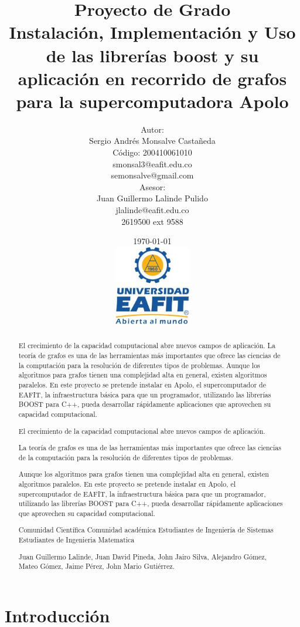 \documentclass[twoside,letterpaper,12pt]{report}
\title{
Proyecto de Grado\\[0.5cm]
Instalación, Implementación y Uso de las librerías boost y su aplicación en recorrido de grafos para la supercomputadora Apolo}
\author{
	Autor:\\[0.3cm]
	Sergio Andrés Monsalve Castañeda\\
	Código: 200410061010\\
	smonsal3@eafit.edu.co\\
	semonsalve@gmail.com\\[0.7cm]
	Asesor: \\[0.3cm]
	Juan Guillermo Lalinde Pulido\\
	jlalinde@eafit.edu.co\\
	2619500 ext 9588%
}
\date{
	\today \\[0.5cm]
	\includegraphics[width=0.25\textwidth]{aux/logo_eafit}
}
\begin{document}
\maketitle

\tableofcontents


\begin{abstract}

El crecimiento de la capacidad computacional abre nuevos campos de aplicación. La teoría de grafos es una de las herramientas más importantes que ofrece las ciencias de la computación para la resolución de diferentes tipos de problemas. Aunque los algoritmos para grafos tienen una complejidad alta en general, existen algoritmos paralelos. En este proyecto se pretende instalar en Apolo, el supercomputador de EAFIT, la infraestructura básica para que un programador, utilizando las librerías BOOST para C++, pueda desarrollar rápidamente aplicaciones que aprovechen su capacidad computacional. 

El crecimiento de la capacidad computacional abre nuevos campos de aplicación. 

La teoría de grafos es una de las herramientas más importantes que ofrece las ciencias de la computación para la resolución de diferentes tipos de problemas. 

Aunque los algoritmos para grafos tienen una complejidad alta en general, existen algoritmos paralelos. En este proyecto se pretende instalar en Apolo, el supercomputador de EAFIT, la infraestructura básica para que un programador, utilizando las librerías BOOST para C++, pueda desarrollar rápidamente aplicaciones que aprovechen su capacidad computacional. 


Comunidad Científica
Comunidad académica
Estudiantes de Ingeniería de Sistemas
Estudiantes de Ingenieria Matematica


\end{abstract}

\newpage

\renewcommand{\abstractname}{Agradecimientos}
\begin{abstract}
Juan Guillermo Lalinde, Juan David Pineda, John Jairo Silva, Alejandro Gómez, Mateo Gómez, Jaime Pérez, John Mario Gutiérrez.
\end{abstract}

\newpage

\chapter{Introducción}
\end{document}
